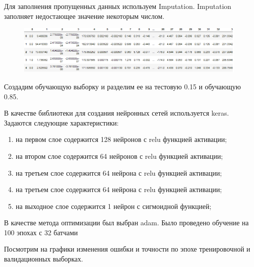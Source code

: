 \documentclass[a4paper,14pt]{article}
\begin{document}
Для заполнения пропущенных данных используем Imputation. Imputation заполняет недостающее значение некоторым числом.

\begin{figure}[h!]
\centering
\includegraphics[scale=0.6]{pics/7.png}
\end{figure}

Создадим обучающую выборку и разделим ее на тестовую 0.15 и обучающую 0.85.

В качестве библиотеки для создания нейронных сетей  используется keras.
Задаются следующие характеристики:
\begin{enumerate}
\item на первом слое содержится 128 нейронов с relu функцией активации;
\item на втором слое содержится 64 нейронов с relu функцией активации;
\item на третьем слое содержится 64 нейрона с relu функцией активации;
\item на третьем слое содержится 64 нейрона с relu функцией активации;
\item на выходное слое содержится 1 нейрон с сигмоидной функцией;
\end{enumerate}
В качестве метода оптимизации был выбран adam. Было проведено обучение на 100 эпохах с 32 батчами

Посмотрим на графики изменения ошибки и точности по эпохе тренировочной и валидационных выборках.
\end{document}
